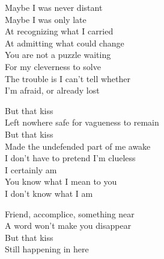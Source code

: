 \begin{lyrics}
Maybe I was never distant\\
Maybe I was only late\\
At recognizing what I carried\\
At admitting what could change\\
You are not a puzzle waiting\\
For my cleverness to solve\\
The trouble is I can't tell whether\\
I'm afraid, or already lost

But that kiss\\
Left nowhere safe for vagueness to remain\\
But that kiss\\
Made the undefended part of me awake\\
I don't have to pretend I'm clueless\\
I certainly am\\
You know what I mean to you\\
I don't know what I am

Friend, accomplice, something near\\
A word won't make you disappear\\
But that kiss\\
Still happening in here
\end{lyrics}

